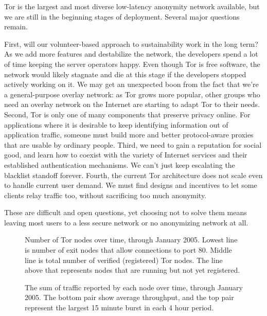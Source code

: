 \documentclass{llncs}
\begin{document}
Tor is the largest and most diverse low-latency anonymity network
available, but we are still in the beginning stages of deployment. Several
major questions remain.

First, will our volunteer-based approach to sustainability work in the
long term? As we add more features and destabilize the network, the
developers spend a lot of time keeping the server operators happy. Even
though Tor is free software, the network would likely stagnate and die at
this stage if the developers stopped actively working on it. We may get
an unexpected boon from the fact that we're a general-purpose overlay
network: as Tor grows more popular, other groups who need an overlay
network on the Internet are starting to adapt Tor to their needs.
%
Second, Tor is only one of many components that preserve privacy online.
For applications where it is desirable to
keep identifying information out of application traffic, someone must build
more and better protocol-aware proxies that are usable by ordinary people.
%
Third, we need to gain a reputation for social good, and learn how to
coexist with the variety of Internet services and their established
authentication mechanisms. We can't just keep escalating the blacklist
standoff forever.
%
Fourth, the current Tor
architecture does not scale even to handle current user demand. We must
find designs and incentives to let some clients relay traffic too, without
sacrificing too much anonymity.

These are difficult and open questions, yet choosing not to solve them
means leaving most users to a less secure network or no anonymizing
network at all.

 

\clearpage
\appendix

\begin{figure}[t]
\centering
\mbox{}
\caption{Number of Tor nodes over time, through January 2005. Lowest
line is number of exit
nodes that allow connections to port 80. Middle line is total number of
verified (registered) Tor nodes. The line above that represents nodes
that are running but not yet registered.}
\label{fig:graphnodes}
\end{figure}

\begin{figure}[t]
\centering
\mbox{}
\caption{The sum of traffic reported by each node over time, through
January 2005. The bottom
pair show average throughput, and the top pair represent the largest 15
minute burst in each 4 hour period.}
\label{fig:graphtraffic}
\end{figure}
\end{document}
